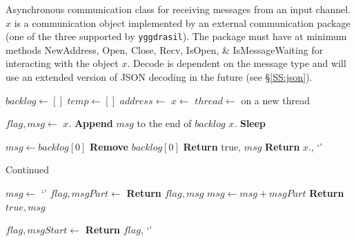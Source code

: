 \documentclass[journal]{IEEEtran}
\newcommand{\pkg}{{\tt yggdrasil}{}}
\begin{document}
\begin{appendices}
\begin{algorithm}[H]
    \caption{Asynchronous communication class for receiving messages from an input channel. $x$ is a communication object implemented by an external communication package (one of the three supported by {\pkg}). The package must have at minimum methods {\sc NewAddress, Open, Close, Recv, IsOpen, \& IsMessageWaiting} for interacting with the object $x$. {\sc Decode} is dependent on the message type and will use an extended version of JSON decoding in the future (see \S\ref{SS:json}).}
    \label{alg:async_recv}
    \begin{algorithmic}[1]
    \item[]
    	\State $backlog \gets []$
	\State $temp \gets []$
		\State $address \gets$ 
	\EndIf
	\State $x \gets$ 
	\State $thread \gets$  on a new thread
	\item[]
				\State $flag, msg \gets$ $x$.
					\State \textbf{Append} $msg$ to the end of $backlog$
				\Else
					\State $x$.
				\EndIf
			\Else
				\State \textbf{Sleep}
			\EndIf
		\EndWhile
	\EndClassMethod
	\item[]
			\State $msg \gets backlog[0]$
			\State \textbf{Remove} $backlog[0]$
			\State \textbf{Return} true, $msg$
		\Else
			\State \textbf{Return} $x.$, `'
		\EndIf
	\EndClassMethod
	\item[]
	\end{algorithmic}
\end{algorithm}
\addtocounter{algorithm}{-1}
\begin{algorithm}[H]
	\caption{Continued}
	\begin{algorithmic}[1]
		\State $msg \gets$ `'
			\State $flag, msgPart \gets$ 
				\State \textbf{Return} $flag, msg$
			\EndIf
			\State $msg \gets msg + msgPart$
		\EndWhile
		\State \textbf{Return} $true, msg$
	\EndClassMethod
	\item[]
		\State $flag, msgStart \gets $
			\State \textbf{Return} $flag$, `'

\end{algorithmic}
\end{algorithm}
\end{appendices}
\end{document}
